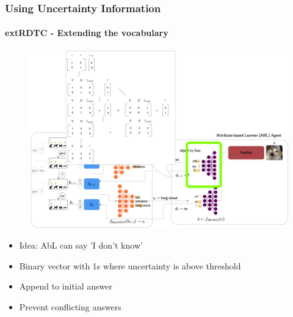 \documentclass[9pt]{beamer}
\begin{document}
\begin{frame}
\frametitle{Using Uncertainty Information}
\framesubtitle{extRDTC - Extending the vocabulary}
\begin{figure}
	\includegraphics[width=0.8\linewidth]{images/how_to_extRDTC.pdf}
\end{figure}
\begin{itemize}
	\item Idea: AbL can say 'I don't know'
	\item Binary vector with 1s where uncertainty is above threshold
	\item Append to  initial answer%
	\item Prevent conflicting answers
\end{itemize}
\end{frame}



\end{document}
